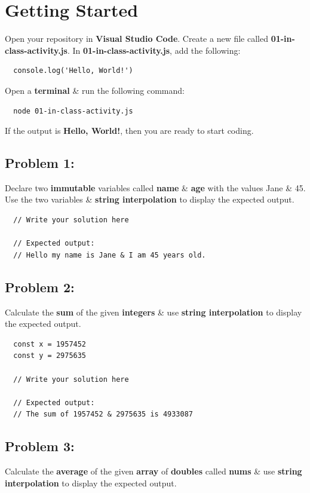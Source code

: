 \documentclass{article}
\begin{document}
\section*{Getting Started}
Open your repository in \textbf{Visual Studio Code}. Create a new file called \textbf{01-in-class-activity.js}. In \textbf{01-in-class-activity.js}, add the following:

\begin{verbatim}
  console.log('Hello, World!')
\end{verbatim}

Open a \textbf{terminal} \& run the following command:

\begin{verbatim}
  node 01-in-class-activity.js
\end{verbatim}

If the output is \textbf{Hello, World!}, then you are ready to start coding.

\subsection*{Problem 1:} 
Declare two \textbf{immutable} variables called \textbf{name} \& \textbf{age} with the values Jane \& 45. Use the two variables \& \textbf{string interpolation} to display the expected output. 

\begin{verbatim}
  // Write your solution here

  // Expected output:
  // Hello my name is Jane & I am 45 years old.
\end{verbatim}

\subsection*{Problem 2:} 
Calculate the \textbf{sum} of the given \textbf{integers} \& use \textbf{string interpolation} to display the expected output.

\begin{verbatim}
  const x = 1957452
  const y = 2975635

  // Write your solution here

  // Expected output:
  // The sum of 1957452 & 2975635 is 4933087
\end{verbatim}

\subsection*{Problem 3:} 
Calculate the \textbf{average} of the given \textbf{array} of \textbf{doubles} called \textbf{nums} \& use \textbf{string interpolation} to display the expected output.
\end{document}
